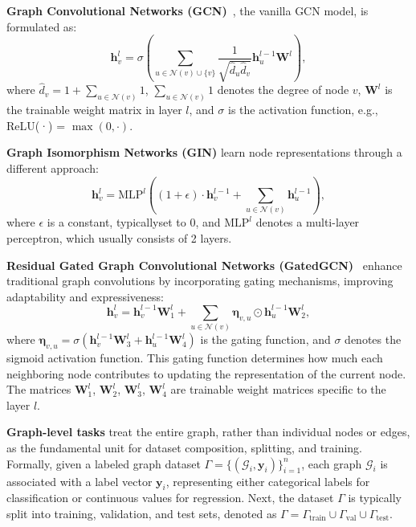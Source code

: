 \textbf{Graph Convolutional Networks (GCN)}~\cite{kipf2017semisupervised}, the vanilla GCN model, is formulated as:
\begin{equation}
\boldsymbol{h}_v^l = \sigma(\sum_{u \in \mathcal{N}(v) \cup \{v\}} \frac{1}{\sqrt{\hat{d}_u \hat{d}_v}} \boldsymbol{h}_{u}^{l-1}\boldsymbol{W}^l),
\label{eq2}
\end{equation} 
where
$\hat{d}_v = 1 + \sum_{u \in \mathcal{N}(v)} 1$, \(\sum_{u \in \mathcal{N}(v)} 1\) denotes the degree of node \(v\), $\boldsymbol{W}^l$ is the trainable weight matrix in layer $l$, and \(\sigma\) is the activation function, e.g., ReLU(·) = \(\max(0, \text{·})\). 

\textbf{Graph Isomorphism Networks (GIN)} \cite{xu2018powerful} %
learn node representations through a different approach:
\begin{equation}
\boldsymbol{h}_v^l =  \text{MLP}^l((1 + \epsilon) \cdot \boldsymbol{h}_{v}^{l-1} + \sum_{u \in\mathcal{N}(v)} \boldsymbol{h}_u^{l-1}),
\end{equation}
where $\epsilon$ is a constant, typicallyset to 0, and $ \text{MLP}^l$ denotes a multi-layer perceptron, which usually consists of 2 layers.

\textbf{Residual Gated Graph Convolutional Networks (GatedGCN)}~\cite{bresson2017residual}
enhance traditional graph convolutions by incorporating gating mechanisms, improving adaptability and expressiveness:
\begin{equation}
\boldsymbol{h}_v^l = \boldsymbol{h}_v^{l-1}\boldsymbol{W}_1^l + \sum_{u \in \mathcal{N}(v)} \boldsymbol{\eta}_{v,u} \odot \boldsymbol{h}_u^{l-1}\boldsymbol{W}_2^l,
\label{eq3}
\end{equation}
where \(\boldsymbol{\eta}_{v,u} = \sigma(\boldsymbol{h}_v^{l-1} \boldsymbol{W}_3^l + \boldsymbol{h}_u^{l-1} \boldsymbol{W}_4^l)\) is the gating function, and \(\sigma\) denotes the sigmoid activation function. This gating function determines how much each neighboring node contributes to updating the representation of the current node. The matrices \(\boldsymbol{W}_1^l\), \(\boldsymbol{W}_2^l\), \(\boldsymbol{W}_3^l\), \(\boldsymbol{W}_4^l\) are trainable weight matrices specific to the layer $l$. 

\textbf{Graph-level tasks} treat the entire graph, rather than individual nodes or edges, as the fundamental unit for dataset composition, splitting, and training. Formally, given a labeled graph dataset $\Gamma = \{(\mathcal{G}_i, \boldsymbol{y}_i)\}_{i=1}^n$, each graph $\mathcal{G}_i$ is associated with a label vector $\boldsymbol{y}_i$, representing either categorical labels for classification or continuous values for regression. Next, the dataset $\Gamma$ is typically split into training, validation, and test sets, denoted as $\Gamma = \Gamma_\text{train} \cup \Gamma_\text{val} \cup \Gamma_\text{test}$. 

